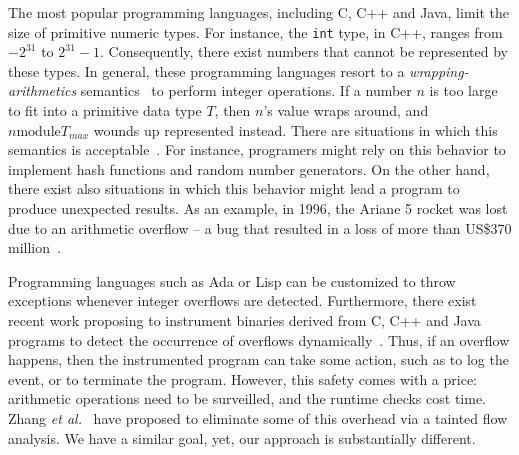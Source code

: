 \documentclass[preprint]{sigplanconf}[10pt]
\begin{document}
The most popular programming languages, including C, C++ and Java, limit the
size of primitive numeric types.
For instance, the \texttt{int} type, in C++, ranges from $-2^{31}$ to
$2^{31}-1$.
Consequently, there exist numbers that cannot be represented by these types.
In general, these programming languages resort to a {\em wrapping-arithmetics}
semantics~\cite{Warren02} to perform integer operations.
If a number $n$ is too large to fit into a primitive data type $T$, then $n$'s
value wraps around, and $n \mbox{module} T_{max}$ wounds up represented
instead.
There are situations in which this semantics is acceptable~\cite{Dietz12}.
For instance, programers might rely on this behavior to implement hash functions
and random number generators.
On the other hand, there exist also situations in which this behavior might
lead a program to produce unexpected results.
As an example, in 1996, the Ariane 5 rocket was lost due to an arithmetic
overflow -- a bug that resulted in a loss of more than US\$370 million~\cite{Dowson97}.



Programming languages such as Ada or Lisp can be customized to throw exceptions
whenever integer overflows are detected.
Furthermore, there exist recent work proposing to instrument binaries derived
from C, C++ and Java programs to detect the occurrence of overflows
dynamically~\cite{Brumley07,Dietz12}.
Thus, if an overflow happens, then the instrumented program can take some
action, such as to log the event, or to terminate the program.
However, this safety comes with a price: arithmetic operations need to be
surveilled, and the runtime checks cost time.
Zhang {\em et al.}~\cite{Zhang09} have proposed to eliminate some of this
overhead via a tainted flow analysis.
We have a similar goal, yet, our approach is substantially different.
\end{document}
